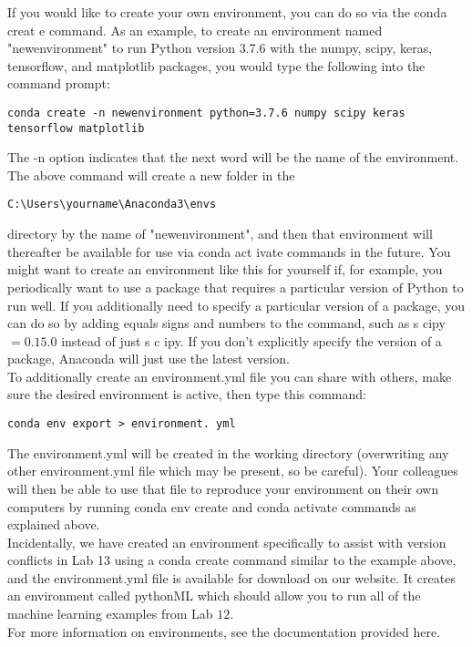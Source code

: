 If you would like to create your own environment, you can do so via the conda creat e command. As an example, to create an environment named "newenvironment" to run Python version 3.7.6 with the numpy, scipy, keras, tensorflow, and matplotlib packages, you would type the following into the command prompt:
\begin{lstlisting}
conda create -n newenvironment python=3.7.6 numpy scipy keras tensorflow matplotlib
\end{lstlisting}
The -n option indicates that the next word will be the name of the environment.
The above command will create a new folder in the
\begin{lstlisting}
C:\Users\yourname\Anaconda3\envs
\end{lstlisting}
directory by the name of "newenvironment", and then that environment will thereafter be available for use via conda act ivate commands in the future.
You might want to create an environment like this for yourself if, for example, you periodically want to use a package that requires a particular version of Python to run well. If you additionally need to specify a particular version of a package, you can do so by adding equals signs and numbers to the command, such as s cipy $=0.15 .0$ instead of just s c ipy. If you don't explicitly specify the version of a package, Anaconda will just use the latest version.\\

To additionally create an environment.yml file you can share with others, make sure the desired environment is active, then type this command:\\

\begin{lstlisting}
conda env export > environment. yml
\end{lstlisting}
The environment.yml will be created in the working directory (overwriting any other environment.yml file which may be present, so be careful). Your colleagues will then be able to use that file to reproduce your environment on their own computers by running conda env create and conda activate commands as explained above.\\

Incidentally, we have created an environment specifically to assist with version conflicts in Lab 13 using a conda create command similar to the example above, and the environment.yml file is available for download on our website. It creates an environment called pythonML which should allow you to run all of the machine learning examples from Lab $12 .$\\

For more information on environments, see the documentation provided here.\\
